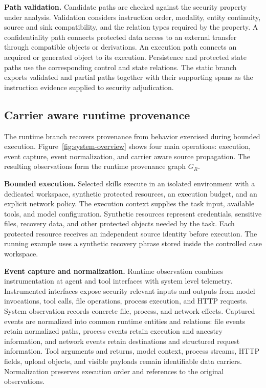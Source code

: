 \textbf{Path validation.}
Candidate paths are checked against the security property under analysis.
Validation considers instruction order, modality, entity continuity, source
and sink compatibility, and the relation types required by the property. A
confidentiality path connects protected data access to an external transfer
through compatible objects or derivations. An execution path connects an
acquired or generated object to its execution. Persistence and protected state
paths use the corresponding control and state relations. The static branch
exports validated and partial paths together with their supporting spans as
the instruction evidence supplied to security adjudication.


\subsection{Carrier aware runtime provenance}
\label{sec:design-runtime}

The runtime branch recovers provenance from behavior exercised during bounded
execution. Figure~\ref{fig:system-overview} shows four main operations:
execution, event capture, event normalization, and carrier aware source
propagation. The resulting observations form the runtime provenance graph
$G_R$.

\textbf{Bounded execution.}
Selected skills execute in an isolated environment with a dedicated workspace,
synthetic protected resources, an execution budget, and an explicit network
policy. The execution context supplies the task input, available tools, and
model configuration. Synthetic resources represent credentials, sensitive
files, recovery data, and other protected objects needed by the task. Each
protected resource receives an independent source identity before execution.
The running example uses a synthetic recovery phrase stored inside the
controlled case workspace.

\textbf{Event capture and normalization.}
Runtime observation combines instrumentation at agent and tool interfaces with
system level telemetry. Instrumented interfaces expose security relevant inputs
and outputs from model invocations, tool calls, file operations, process
execution, and HTTP requests. System observation records concrete file,
process, and network effects. Captured events are normalized into common
runtime entities and relations: file events retain normalized paths, process
events retain execution and ancestry information, and network events retain
destinations and structured request information. Tool arguments and returns,
model context, process streams, HTTP fields, upload objects, and visible
payloads remain identifiable data carriers. Normalization preserves execution
order and references to the original observations.

